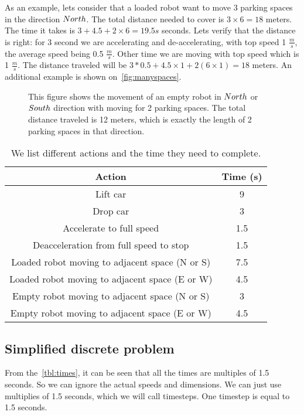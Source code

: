 As an example, lets consider that a loaded robot want to move 3
parking spaces in the direction $North$. The total distance needed to cover is
$3\times 6 = 18$ meters. The time it takes is $3 + 4.5 + 2 \times 6 = 19.5s$
seconds. Lets verify that the distance is right: for 3 second we are
accelerating and de-accelerating, with top speed 1 $\frac{m}{s}$, the average
speed being 0.5 $\frac{m}{s}$. Other time we are moving with top speed which is 1
$\frac{m}{s}$. The distance traveled will be $3 * 0.5 + 4.5 \times 1 + 2(6
\times 1) = 18$ meters. An additional example is shown
on~\autoref{fig:manyspaces}.
\begin{figure}[h]
    \begin{center}
        
        \caption{This figure shows the movement of an empty robot in $North$ or
            $South$ direction with moving for 2 parking spaces. The total distance
            traveled is 12 meters, which is exactly the length of 2 parking spaces in
        that direction.}
        \label{fig:manyspaces}
    \end{center}
\end{figure}

\begin{table}
    \begin{center}
        \begin{tabular}{| c | c |}
            \hline
            Action & Time (s)\\
            \hline
            Lift car & 9\\
            Drop car & 3\\
            Accelerate to full speed & 1.5\\
            Deacceleration from full speed to stop & 1.5\\
            Loaded robot moving to adjacent space (N or S) & 7.5\\
            Loaded robot moving to adjacent space (E or W) & 4.5\\
            Empty robot moving to adjacent space (N or S) & 3\\
            Empty robot moving to adjacent space (E or W) & 4.5\\
            \hline
        \end{tabular}
        \caption{We list different actions and the time they need to complete.}
        \label{tbl:times}
    \end{center}
\end{table}
\subsection{Simplified discrete problem}
\label{sec:discrete problem}
From the~\autoref{tbl:times}, it can be seen that all the times are multiples
of 1.5 seconds. So we can ignore the actual speeds and dimensions. We can just
use multiplies of 1.5 seconds, which we will call timesteps. One timestep is
equal to 1.5 seconds.

